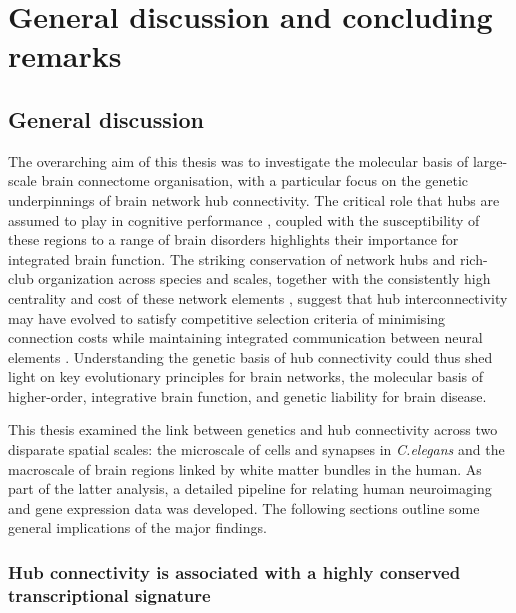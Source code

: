 \chapter{General discussion and concluding \\ remarks}
\label{ch:Discussion}

\section{General discussion}
The overarching aim of this thesis was to investigate the molecular basis of large-scale brain connectome organisation, with a particular focus on the genetic underpinnings of brain network hub connectivity. The critical role that hubs are assumed to play in cognitive performance \mbox{\citep{Buckner2009}}, coupled with the susceptibility of these regions to a range of brain disorders \citep{Bassett2009a,Crossley2014,Fornito2015} highlights their importance for integrated brain function. The striking conservation of network hubs and rich-club organization across species and scales, together with the consistently high centrality and cost of these network elements \citep{VandenHeuvel2016}, suggest that hub interconnectivity may have evolved to satisfy competitive selection criteria of minimising connection costs while maintaining integrated communication between neural elements \citep{Bullmore2012}. Understanding the genetic basis of hub connectivity could thus shed light on key evolutionary principles for brain networks, the molecular basis of higher-order, integrative brain function, and genetic liability for brain disease.

This thesis examined the link between genetics and hub connectivity across two disparate spatial scales: the microscale of cells and synapses in \textit{C.elegans} and the macroscale of brain regions linked by white matter bundles in the human. As part of the latter analysis, a detailed pipeline for relating human neuroimaging and gene expression data was developed. The following sections outline some general implications of the major findings.

\subsection*{Hub connectivity is associated with a highly conserved transcriptional signature}


